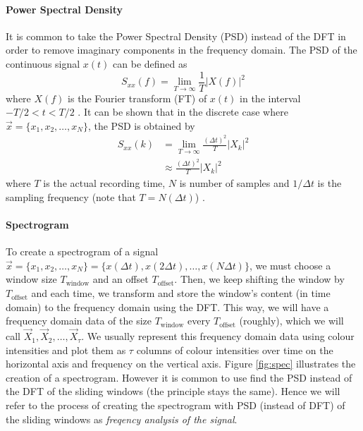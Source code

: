 \paragraph{Power Spectral Density}
	It is common to take the Power Spectral Density (PSD) instead of the DFT in order to remove imaginary components in the frequency domain. The PSD of the continuous signal $x(t)$ can be defined as
	\begin{equation}
		S_{xx}(f) = \lim_{T \to \infty} \frac{1}{T} \left| X(f) \right|^2
	\end{equation}
	where $X(f)$ is the Fourier transform (FT) of $x(t)$ in the interval $-T / 2 < t < T / 2$ \cite{hlt}. It can be shown that in the discrete case where $\vec x = \{x_1, x_2, \dotsc, x_{N}\}$, the PSD is obtained by
	\begin{align}
		S_{xx}(k) 	&= \lim_{T \to \infty} \frac{(\Delta t)^2}{T} |X_k|^2\\
					&\approx \frac{(\Delta t)^2}{T} |X_k|^2
	\end{align}
	where $T$ is the actual recording time, $N$ is number of samples and $1/\Delta t$ is the sampling frequency (note that $T = N(\Delta t)$) \cite{wiki:PSD}.

\paragraph{Spectrogram}
	To create a spectrogram of a signal $\vec x = \{x_1, x_2, \dotsc, x_N\} = \{x(\Delta t), x(2\Delta t), \dotsc, x(N\Delta t)\}$, we must choose a window size $T_\text{window}$ and an offset $T_\text{offset}$. Then, we keep shifting the window by $T_\text{offset}$ and each time, we transform and store the window's content (in time domain) to the frequency domain using the DFT. This way, we will have a frequency domain data of the size $T_\text{window}$ every $T_\text{offset}$ (roughly), which we will call $\vec X_1, \vec X_2, \dotsc, \vec X_\tau$. We usually represent this frequency domain data using colour intensities and plot them as $\tau$ columns of colour intensities over time on the horizontal axis and frequency on the vertical axis. Figure \ref{fig:spec} illustrates the creation of a spectrogram. However it is common to use find the PSD instead of the DFT of the sliding windows (the principle stays the same). Hence we will refer to the process of creating the spectrogram with PSD (instead of DFT) of the sliding windows as \emph{freqency analysis of the signal}.

